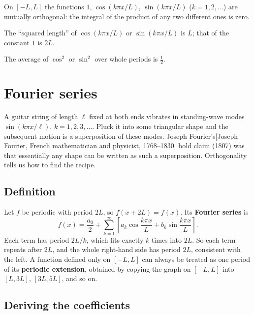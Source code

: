 \begin{keyideas}
\item On $[-L,L]$ the functions $1$, $\cos(k\pi x/L)$, $\sin(k\pi x/L)$ ($k=1,2,\dots$) are mutually orthogonal: the integral of the product of any two different ones is zero.
\item The ``squared length'' of $\cos(k\pi x/L)$ or $\sin(k\pi x/L)$ is $L$; that of the constant $1$ is $2L$.
\item The average of $\cos^2$ or $\sin^2$ over whole periods is $\tfrac12$.
\end{keyideas}

\section{Fourier series}\label{sec:fourier-series-series}

A guitar string of length $\ell$ fixed at both ends vibrates in standing-wave modes $\sin(k\pi x/\ell)$, $k=1,2,3,\dots$. Pluck it into some triangular shape and the subsequent motion is a superposition of these modes. Joseph Fourier's[Joseph Fourier, French mathematician and physicist, 1768--1830] bold claim (1807) was that essentially any shape can be written as such a superposition. Orthogonality tells us how to find the recipe.

\subsection{Definition}

Let $f$ be periodic with period $2L$, so $f(x+2L)=f(x)$. Its \textbf{Fourier series} is
\begin{equation}
f(x)=\frac{a_0}{2}+\sum_{k=1}^{\infty}\left[a_k\cos\frac{k\pi x}{L}+b_k\sin\frac{k\pi x}{L}\right].
\label{eq:fourier-series-FS}
\end{equation}
Each term has period $2L/k$, which fits exactly $k$ times into $2L$. So each term repeats after $2L$, and the whole right-hand side has period $2L$, consistent with the left. A function defined only on $[-L,L]$ can always be treated as one period of its \textbf{periodic extension}, obtained by copying the graph on $[-L,L]$ into $[L,3L]$, $[3L,5L]$, and so on.

\subsection{Deriving the coefficients}

